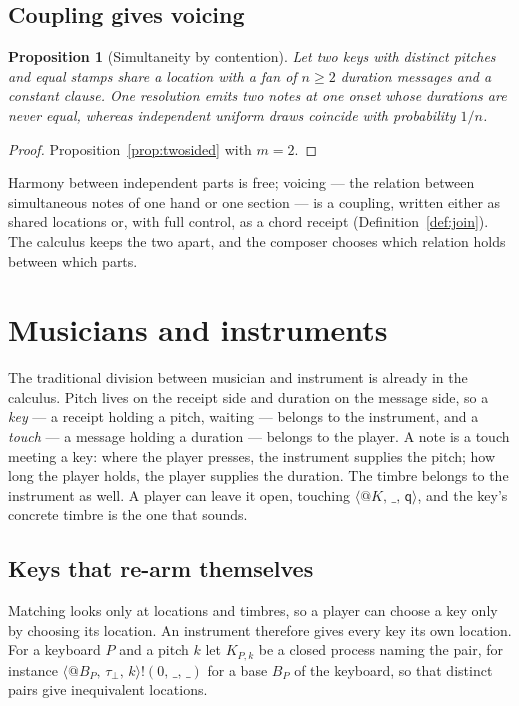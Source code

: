 \documentclass[11pt,a4paper]{article}
\makeatletter
\theoremstyle{plain}
\newtheorem{proposition}[theorem]{Proposition}
\theoremstyle{definition}
\theoremstyle{remark}
\newcommand{\nm}[3]{\langle @#1,\,#2,\,#3\rangle}
\newcommand{\snd}[4]{#1!(#2,\,#3,\,#4)}
\newcommand{\wild}{\_}
\makeatother
\begin{document}
\subsection{Coupling gives voicing}

\begin{proposition}[Simultaneity by contention]\label{prop:coupled}
Let two keys with distinct pitches and equal stamps share a location with a fan
of $n\ge2$ duration messages and a constant clause. One resolution emits two
notes at one onset whose durations are never equal, whereas independent uniform
draws coincide with probability $1/n$.
\end{proposition}
\begin{proof}
Proposition~\ref{prop:twosided} with $m=2$.
\end{proof}

Harmony between independent parts is free; voicing --- the relation between
simultaneous notes of one hand or one section --- is a coupling, written either
as shared locations or, with full control, as a chord receipt
(Definition~\ref{def:join}). The calculus keeps the two apart, and the composer
chooses which relation holds between which parts.

\section{Musicians and instruments}\label{sec:instruments}

The traditional division between musician and instrument is already in the
calculus. Pitch lives on the receipt side and duration on the message side, so
a \emph{key} --- a receipt holding a pitch, waiting --- belongs to the
instrument, and a \emph{touch} --- a message holding a duration --- belongs to
the player. A note is a touch meeting a key: where the player presses, the
instrument supplies the pitch; how long the player holds, the player supplies
the duration. The timbre belongs to the instrument as well. A player can leave
it open, touching $\nm{K}{\wild}{\mathsf{q}}$, and the key's concrete timbre is
the one that sounds.

\subsection{Keys that re-arm themselves}

Matching looks only at locations and timbres, so a player can choose a key only
by choosing its location. An instrument therefore gives every key its own
location. For a keyboard $P$ and a pitch $k$ let $K_{P,k}$ be a closed process
naming the pair, for instance $\snd{\nm{B_P}{\tau_\bot}{k}}{0}{\wild}{\wild}$ for
a base $B_P$ of the keyboard, so that distinct pairs give inequivalent
locations.
\end{document}
